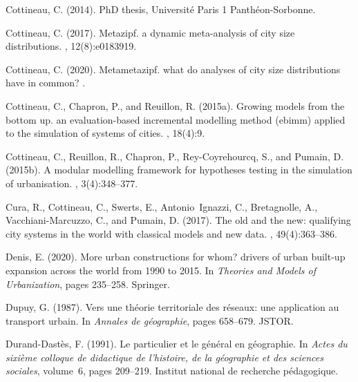 \documentclass[10pt]{article}
\begin{document}
\begin{thebibliography}{}
Cottineau, C. (2014).
\newblock PhD thesis, Universit{\'e} Paris 1 Panth{\'e}on-Sorbonne.

Cottineau, C. (2017).
\newblock Metazipf. a dynamic meta-analysis of city size distributions.
, 12(8):e0183919.

Cottineau, C. (2020).
\newblock Metametazipf. what do analyses of city size distributions have in
  common?
.

Cottineau, C., Chapron, P., and Reuillon, R. (2015a).
\newblock Growing models from the bottom up. an evaluation-based incremental
  modelling method (ebimm) applied to the simulation of systems of cities.
, 18(4):9.

Cottineau, C., Reuillon, R., Chapron, P., Rey-Coyrehourcq, S., and Pumain, D.
  (2015b).
\newblock A modular modelling framework for hypotheses testing in the
  simulation of urbanisation.
, 3(4):348--377.

Cura, R., Cottineau, C., Swerts, E., Antonio~Ignazzi, C., Bretagnolle, A.,
  Vacchiani-Marcuzzo, C., and Pumain, D. (2017).
\newblock The old and the new: qualifying city systems in the world with
  classical models and new data.
, 49(4):363--386.

Denis, E. (2020).
\newblock More urban constructions for whom? drivers of urban built-up
  expansion across the world from 1990 to 2015.
\newblock In {\em Theories and Models of Urbanization}, pages 235--258.
  Springer.

Dupuy, G. (1987).
\newblock Vers une th{\'e}orie territoriale des r{\'e}seaux: une application au
  transport urbain.
\newblock In {\em Annales de g{\'e}ographie}, pages 658--679. JSTOR.

Durand-Dast{\`e}s, F. (1991).
\newblock Le particulier et le g{\'e}n{\'e}ral en g{\'e}ographie.
\newblock In {\em Actes du sixi{\`e}me colloque de didactique de l'histoire, de
  la g{\'e}ographie et des sciences sociales}, volume~6, pages 209--219.
  Institut national de recherche p{\'e}dagogique.


\end{thebibliography}
\end{document}
